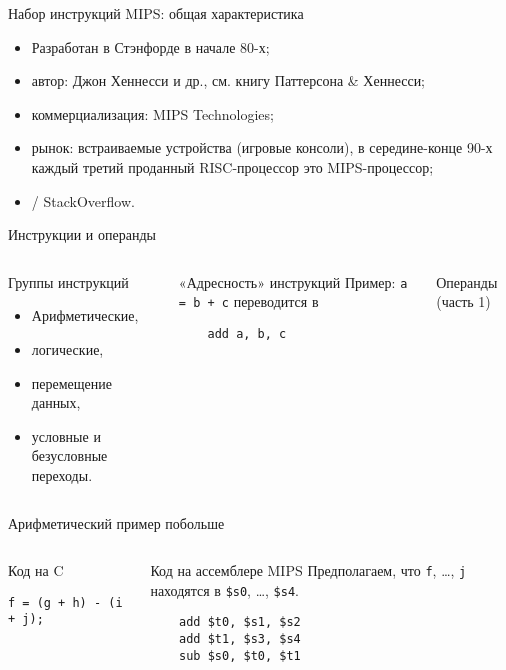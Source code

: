 \begin{frame}{Набор инструкций MIPS: общая характеристика}
\begin{itemize}[<+->]
    \item Разработан в Стэнфорде в начале 80-х;
    \item автор: Джон Хеннесси и др., см. книгу Паттерсона \& Хеннесси;
    \item коммерциализация: MIPS Technologies;
    \item рынок: встраиваемые устройства (игровые консоли),
    в середине-конце 90-х каждый третий проданный RISC-процессор это MIPS-процессор;
    \item {} / StackOverflow.
\end{itemize}
\end{frame}

\begin{frame}[fragile]{Инструкции и операнды}

\begin{columns}
    \column{6.3cm}
\pause
\begin{block}{Группы инструкций}
\begin{itemize}
    \item Арифметические,
    \item логические,
    \item перемещение данных,
    \item условные и безусловные переходы.
\end{itemize}
\end{block}

\pause

\begin{block}{«Адресность» инструкций}
Пример: \texttt{a = b + c} переводится в
\begin{verbatim}
    add a, b, c
\end{verbatim}
\end{block}


\pause
    \column{5.7cm}
Операнды (часть 1)
\end{columns}
\end{frame}

\begin{frame}[fragile]{Арифметический пример побольше}
\begin{columns}
    \column{5.5cm}
\begin{block}{Код на C}
\begin{verbatim}
f = (g + h) - (i + j);\end{verbatim}
\end{block}

    \column{5.5cm}
\pause
\begin{block}{Код на ассемблере MIPS}
Предполагаем, что \texttt{f}, …, \texttt{j} находятся в \texttt{\$s0}, …, \texttt{\$s4}.
\begin{verbatim}
    add $t0, $s1, $s2
    add $t1, $s3, $s4
    sub $s0, $t0, $t1
\end{verbatim}
\end{block}
\end{columns}
\end{frame}

